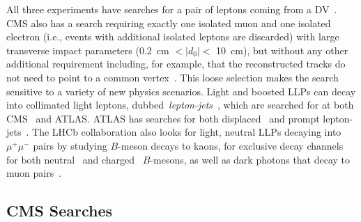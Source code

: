 All three experiments have searches for a pair of leptons coming from a DV~\cite{Aad:2015rba,CMS:2014hka,CMS:2015pca,Aaij:2015tna,Aaij:2016qsm,Aaij:2017rft}. CMS also has a search requiring exactly one isolated muon and one isolated electron (i.e., events with additional isolated leptons are discarded) with large transverse impact parameters (0.2~cm $< |d_{0}| <$ 10~cm), but without any other additional requirement including, for example, that the reconstructed tracks do not need to point to a common vertex~\cite{CMS-PAS-EXO-16-022}. This loose selection makes the search sensitive to a variety of new physics scenarios. Light and boosted LLPs can decay into collimated light leptons, dubbed~\emph{lepton-jets}~\cite{ArkaniHamed:2008qp}, which are searched for at both CMS~\cite{Khachatryan:2015wka} and ATLAS. ATLAS has searches for both displaced~\cite{Aad:2014yea,ATLAS-CONF-2016-042} and prompt lepton-jets~\cite{Aad:2015sms}. The LHCb collaboration also looks for light, neutral LLPs decaying into $\mu^+ \mu^-$ pairs by studying $B$-meson decays to kaons, for exclusive decay channels for both neutral~\cite{Aaij:2015tna} and charged~\cite{Aaij:2016qsm} $B$-mesons, as well as dark photons that decay to muon pairs~\cite{Aaij:2017rft}.

\subsection{CMS Searches}
\label{sec:CMSleptonic}

